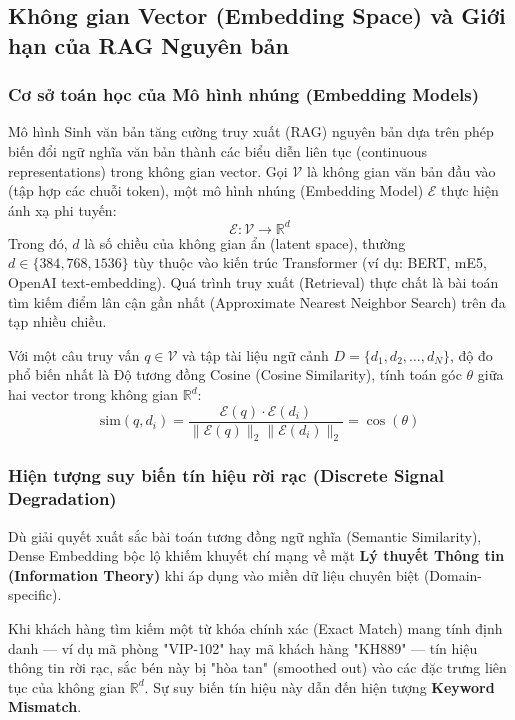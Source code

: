 \subsection{Không gian Vector (Embedding Space) và Giới hạn của RAG Nguyên bản}

\subsubsection{Cơ sở toán học của Mô hình nhúng (Embedding Models)}
Mô hình Sinh văn bản tăng cường truy xuất (RAG) nguyên bản dựa trên phép biến đổi ngữ nghĩa văn bản thành các biểu diễn liên tục (continuous representations) trong không gian vector. Gọi $\mathcal{V}$ là không gian văn bản đầu vào (tập hợp các chuỗi token), một mô hình nhúng (Embedding Model) $\mathcal{E}$ thực hiện ánh xạ phi tuyến:
\begin{equation}
    \mathcal{E}: \mathcal{V} \rightarrow \mathbb{R}^d
\end{equation}
Trong đó, $d$ là số chiều của không gian ẩn (latent space), thường $d \in \{384, 768, 1536\}$ tùy thuộc vào kiến trúc Transformer (ví dụ: BERT, mE5, OpenAI text-embedding). Quá trình truy xuất (Retrieval) thực chất là bài toán tìm kiếm điểm lân cận gần nhất (Approximate Nearest Neighbor Search) trên đa tạp nhiều chiều. 

Với một câu truy vấn $q \in \mathcal{V}$ và tập tài liệu ngữ cảnh $D = \{d_1, d_2, \dots, d_N\}$, độ đo phổ biến nhất là Độ tương đồng Cosine (Cosine Similarity), tính toán góc $\theta$ giữa hai vector trong không gian $\mathbb{R}^d$:
\begin{equation}
    \text{sim}(q, d_i) = \frac{\mathcal{E}(q) \cdot \mathcal{E}(d_i)}{\|\mathcal{E}(q)\|_2 \|\mathcal{E}(d_i)\|_2} = \cos(\theta)
\end{equation}

\subsubsection{Hiện tượng suy biến tín hiệu rời rạc (Discrete Signal Degradation)}
Dù giải quyết xuất sắc bài toán tương đồng ngữ nghĩa (Semantic Similarity), Dense Embedding bộc lộ khiếm khuyết chí mạng về mặt \textbf{Lý thuyết Thông tin (Information Theory)} khi áp dụng vào miền dữ liệu chuyên biệt (Domain-specific).

Khi khách hàng tìm kiếm một từ khóa chính xác (Exact Match) mang tính định danh — ví dụ mã phòng "VIP-102" hay mã khách hàng "KH889" — tín hiệu thông tin rời rạc, sắc bén này bị "hòa tan" (smoothed out) vào các đặc trưng liên tục của không gian $\mathbb{R}^d$. Sự suy biến tín hiệu này dẫn đến hiện tượng \textbf{Keyword Mismatch}. 

